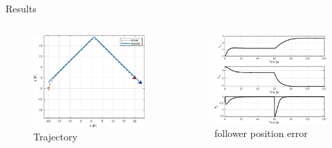 \documentclass{beamer}
\begin{document}
\begin{frame}{Results}
\begin{columns}
\begin{column}{0.5\textwidth}
\begin{figure}
\includegraphics[scale=0.4]{figs/matlab/rectLinear/trajectory.eps}
\caption{Trajectory}
\end{figure}
\end{column}

\begin{column}{0.5\textwidth}
\begin{center}

\begin{figure}
\includegraphics[scale=0.4]{figs/matlab/rectLinear/error.eps}
\caption{follower position error}
\end{figure}
\end{center}

\end{column}

\end{columns}
\end{frame}
\end{document}
